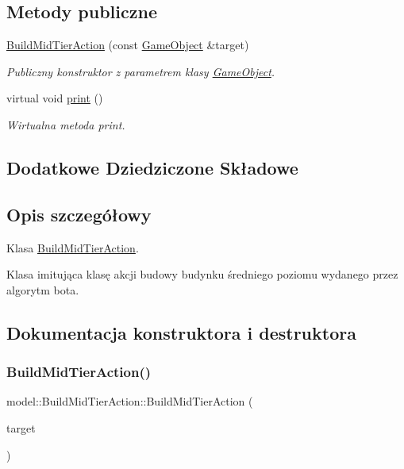 \subsection*{Metody publiczne}
\begin{DoxyCompactItemize}
\item 
\hyperlink{classmodel_1_1BuildMidTierAction_a8847e6f9fb9970ad1afaf2533147ed32}{Build\+Mid\+Tier\+Action} (const \hyperlink{classmodel_1_1GameObject}{Game\+Object} \&target)
\begin{DoxyCompactList}\small\item\em Publiczny konstruktor z parametrem klasy \hyperlink{classmodel_1_1GameObject}{Game\+Object}. \end{DoxyCompactList}\item 
virtual void \hyperlink{classmodel_1_1BuildMidTierAction_abec06b6ae68325996228e9b36c9d05d3}{print} ()
\begin{DoxyCompactList}\small\item\em Wirtualna metoda print. \end{DoxyCompactList}\end{DoxyCompactItemize}
\subsection*{Dodatkowe Dziedziczone Składowe}


\subsection{Opis szczegółowy}
Klasa \hyperlink{classmodel_1_1BuildMidTierAction}{Build\+Mid\+Tier\+Action}. 

Klasa imitująca klasę akcji budowy budynku średniego poziomu wydanego przez algorytm bota. 

\subsection{Dokumentacja konstruktora i destruktora}
\mbox{\label{classmodel_1_1BuildMidTierAction_a8847e6f9fb9970ad1afaf2533147ed32}} 
\subsubsection{\texorpdfstring{Build\+Mid\+Tier\+Action()}{BuildMidTierAction()}}
{\footnotesize\ttfamily model\+::\+Build\+Mid\+Tier\+Action\+::\+Build\+Mid\+Tier\+Action (\begin{DoxyParamCaption}\item[{const \hyperlink{classmodel_1_1GameObject}{Game\+Object} \&}]{target }\end{DoxyParamCaption})\hspace{0.3cm}{\ttfamily [inline]}}



